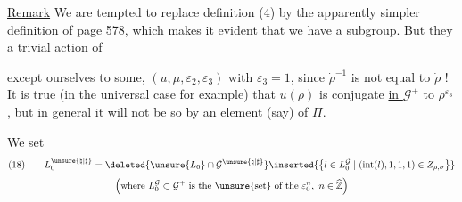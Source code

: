 \uline{Remark} We are tempted to replace definition (4)
by the apparently simpler definition of page 578,
which makes it evident that we have a subgroup.
But they 
a trivial action of



except   ourselves to some, $(u,\mu,\varepsilon_2,\varepsilon_3)$ with $\varepsilon_3=1$,
since $\dot{\rho}^{-1}$ is not equal to $\dot{\rho}$ ! It is true 
(in the universal case for example) that $u(\rho)$ is conjugate \uline{in $\mathcal{G}^{+}$}
to $\rho^{\varepsilon_3}$, but in general it will not be so by an element (say) of $\Pi$.

We set
\[
\begin{gathered}(18)\qquad
L_0^{\unsure{\natural|\sharp}}
=\deleted{\unsure{L_0}\cap\mathcal{G}^{\unsure{\natural|\sharp}}}
\inserted{\bigl\{l\in L_0^{\mathcal{G}}\mid
(\operatorname{int}(l),1,1,1)\in Z_{\rho,\sigma}\bigr\}}
\\[3pt]
\left(\text{where }L_0^{\mathcal{G}}\subset\mathcal{G}^{+}
\text{ is the \unsure{set} of the }\varepsilon_0^n,\ n\in\widehat{\mathbb{Z}}\right)
\end{gathered}\]

